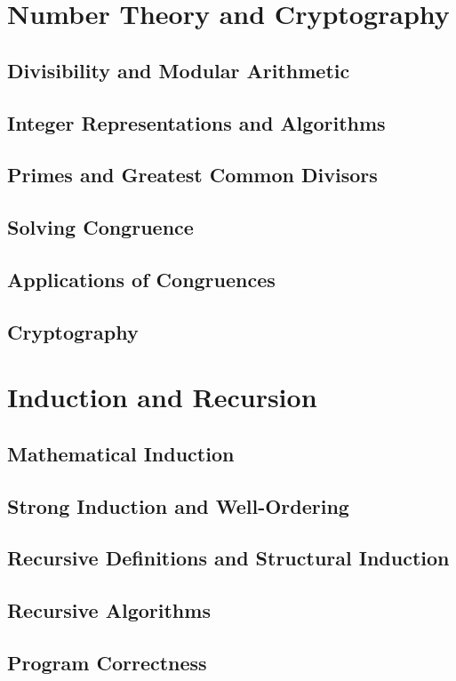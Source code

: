 \documentclass{article}
\begin{document}
\section{Number Theory and Cryptography}

\subsection{Divisibility and Modular Arithmetic}
\subsection{Integer Representations and Algorithms}
\subsection{Primes and Greatest Common Divisors}
\subsection{Solving Congruence}
\subsection{Applications of Congruences}
\subsection{Cryptography}

\section{Induction and Recursion}

\subsection{Mathematical Induction}
\subsection{Strong Induction and Well-Ordering}
\subsection{Recursive Definitions and Structural Induction}
\subsection{Recursive Algorithms}
\subsection{Program Correctness}
\end{document}
